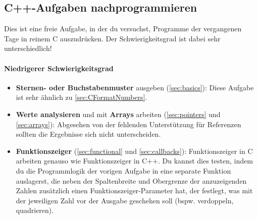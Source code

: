 
\subsection{C++-Aufgaben nachprogrammieren \optional}

\optionaltextbox

Dies ist eine freie Aufgabe, in der du versuchst, Programme der vergangenen Tage in reinem C auszudrücken.
Der Schwierigkeitsgrad ist dabei sehr unterschiedlich!

\paragraph{Niedrigerer Schwierigkeitsgrad}
\begin{itemize}
\item
\textbf{Sternen- oder Buchstabenmuster} ausgeben (\ref{sec:basics}):
Diese Aufgabe ist sehr ähnlich zu \ref{sec:CFormatNumbers}.

\item
\textbf{Werte analysieren} und mit \textbf{Arrays} arbeiten (\ref{sec:pointers} und \ref{sec:arrays}):
Abgesehen von der fehlenden Unterstützung für Referenzen sollten die Ergebnisse sich nicht unterscheiden.

\item
\textbf{Funktionszeiger} (\ref{sec:functional} und \ref{sec:callbacks}):
Funktionszeiger in C arbeiten genauso wie Funktionszeiger in C++.
Du kannst dies testen, indem du die Programmlogik der vorigen Aufgabe in eine separate Funktion auslagerst, die neben der Spaltenbreite und Obergrenze der anzuzeigenden Zahlen zusätzlich einen Funktionszeiger-Parameter hat, der festlegt, was mit der jeweiligen Zahl vor der Ausgabe geschehen soll (bspw. verdoppeln, quadrieren).
\end{itemize}

